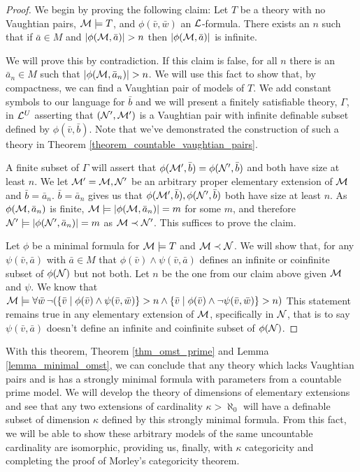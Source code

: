 \begin{proof}
We begin by proving the following claim: Let \(T\) be a theory with no Vaughtian pairs, \(\mathcal{M} \models T\), and \(\phi(\bar{v}, \bar{w})\) an \(\mathcal{L}\)-formula.
There exists an \(n\) such that if \(\bar{a} \in M\) and \(|\phi(\mathcal{M}, \bar{a})| > n\) then \(|\phi(\mathcal{M}, \bar{a})|\) is infinite. 

We will prove this by contradiction. 
If this claim is false, for all \(n\) there is an \(\bar{a}_n \in M\) such that \(|\phi(\mathcal{M}, \bar{a}_n)| > n\). 
We will use this fact to show that, by compactness, we can find a Vaughtian pair of models of \(T\).
We add constant symbols to our language for \(\bar{b}\) and we will present a finitely satisfiable theory, \(\Gamma\), in \(\mathcal{L}^U\) asserting that \((\mathcal{N}', \mathcal{M}')\) is a Vaughtian pair with infinite definable subset defined by \(\phi(\bar{v}, \bar{b})\). 
Note that we've demonstrated the construction of such a theory in Theorem \ref{theorem_countable_vaughtian_pairs}.

A finite subset of \(\Gamma\) will assert that \(\phi(\mathcal{M}', \bar{b}) = \phi(\mathcal{N}', \bar{b})\) and both have size at least \(n\). 
We let \(\mathcal{M}' = \mathcal{M}, \mathcal{N}'\) be an arbitrary proper elementary extension of \(\mathcal{M}\) and \(\bar{b} = \bar{a}_n\). 
\(\bar{b} = \bar{a}_n\) gives us that \(\phi(\mathcal{M}', \bar{b}), \phi(\mathcal{N}', \bar{b})\) both have size at least \(n\). 
As \(\phi(\mathcal{M}, \bar{a}_n)\) is finite, \(\mathcal{M} \models |\phi(\mathcal{M}, \bar{a}_n)| = m\) for some \(m\), and therefore \(\mathcal{N}' \models |\phi(\mathcal{N}', \bar{a}_n)| = m\) as \(\mathcal{M} \prec \mathcal{N}'\).
This suffices to prove the claim. 

Let \(\phi\) be a minimal formula for \(\mathcal{M} \models T\) and \(\mathcal{M} \prec \mathcal{N}\).
We will show that, for any \(\psi(\bar{v}, \bar{a})\) with \(\bar{a} \in M\) that \(\phi(\bar{v}) \land \psi(\bar{v}, \bar{a})\) defines an infinite or coinfinite subset of \(\phi(\mathcal{N})\) but not both. 
Let \(n\) be the one from our claim above given \(\mathcal{M}\) and \(\psi\). 
We know that \(\mathcal{M} \models \forall \bar{w} \, \neg(\{\bar{v} \mid \phi(\bar{v}) \land \psi(\bar{v}, \bar{w})\} > n \land \{\bar{v} \mid \phi(\bar{v}) \land \neg\psi(\bar{v}, \bar{w})\} > n)\)
This statement remains true in any elementary extension of \(\mathcal{M}\), specifically in \(\mathcal{N}\), that is to say \(\psi(\bar{v}, \bar{a})\) doesn't define an infinite and coinfinite subset of \(\phi(\mathcal{N})\).
\end{proof}

With this theorem, Theorem \ref{thm_omst_prime} and Lemma \ref{lemma_minimal_omst}, we can conclude that any theory which lacks Vaughtian pairs and is \omst has a strongly minimal formula with parameters from a countable prime model. 
We will develop the theory of dimensions of elementary extensions and see that any two extensions of cardinality \(\kappa > \aleph_0\) will have a definable subset of dimension \(\kappa\) defined by this strongly minimal formula. 
From this fact, we will be able to show these arbitrary models of the same uncountable cardinality are isomorphic, providing us, finally, with \(\kappa\) categoricity and completing the proof of Morley's categoricity theorem. 

